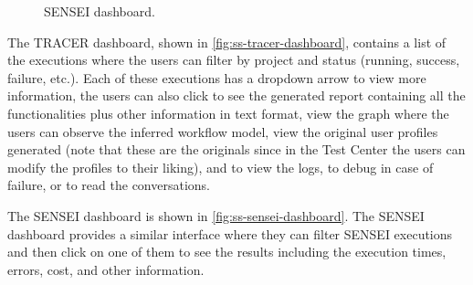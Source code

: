\begin{figure}[htpb]
  \centering
  \caption{SENSEI dashboard.}
  \label{fig:ss-sensei-dashboard}
\end{figure}


The \ac{TRACER} dashboard,
shown in \autoref{fig:ss-tracer-dashboard},
contains a list of the executions
where the users can filter by project and status (running, success, failure, etc.).
Each of these executions has a dropdown arrow to view more information,
the users can also click to see the generated report
containing all the functionalities plus other information in text format,
view the graph where the users can observe the inferred workflow model,
view the original user profiles generated
(note that these are the originals since in the Test Center
the users can modify the profiles to their liking),
and to view the logs, to debug in case of failure, or to read the conversations.



The SENSEI dashboard is shown in \autoref{fig:ss-sensei-dashboard}.
The SENSEI dashboard provides a similar interface
where they can filter SENSEI executions
and then click on one of them to see the results
including the execution times,
errors, cost, and other information.
